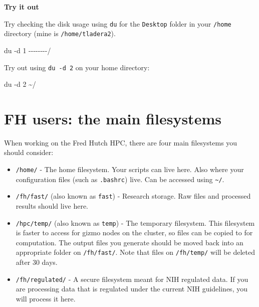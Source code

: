 \documentclass[
  letterpaper,
  DIV=11,
  numbers=noendperiod]{scrreprt}
\newenvironment{Shaded}{\begin{snugshade}}{\end{snugshade}}
\newcommand{\AttributeTok}[1]{\textcolor[rgb]{0.40,0.45,0.13}{#1}}
\newcommand{\FunctionTok}[1]{\textcolor[rgb]{0.28,0.35,0.67}{#1}}
\newcommand{\NormalTok}[1]{\textcolor[rgb]{0.00,0.23,0.31}{#1}}
\providecommand{\tightlist}{%
  \setlength{\itemsep}{0pt}\setlength{\parskip}{0pt}}
\begin{document}
\begin{tcolorbox}[enhanced jigsaw, breakable, leftrule=.75mm, colframe=quarto-callout-color-frame, left=2mm, toprule=.15mm, arc=.35mm, rightrule=.15mm, opacityback=0, bottomrule=.15mm, colback=white]

\vspace{-3mm}\textbf{Try it out}\vspace{3mm}

Try checking the disk usage using \texttt{du} for the \texttt{Desktop}
folder in your \texttt{/home} directory (mine is
\texttt{/home/tladera2}).

\begin{Shaded}
\begin{Highlighting}[]
\FunctionTok{du} \AttributeTok{{-}d}\NormalTok{ 1 }\AttributeTok{{-}{-}{-}{-}{-}{-}{-}{-}}\NormalTok{/}
\end{Highlighting}
\end{Shaded}

Try out using \texttt{du\ -d\ 2} on your home directory:

\begin{Shaded}
\begin{Highlighting}[]
\FunctionTok{du} \AttributeTok{{-}d}\NormalTok{ 2 \textasciitilde{}/}
\end{Highlighting}
\end{Shaded}

\end{tcolorbox}

\section{FH users: the main filesystems}\label{sec-filesystems}

When working on the Fred Hutch HPC, there are four main filesystems you
should consider:

\begin{itemize}
\tightlist
\item
  \texttt{/home/} - The home filesystem. Your scripts can live here.
  Also where your configuration files (such as \texttt{.bashrc}) live.
  Can be accessed using \texttt{\textasciitilde{}/}.
\item
  \texttt{/fh/fast/} (also known as \texttt{fast}) - Research storage.
  Raw files and processed results should live here.
\item
  \texttt{/hpc/temp/} (also known as \texttt{temp}) - The temporary
  filesystem. This filesystem is faster to access for gizmo nodes on the
  cluster, so files can be copied to for computation. The output files
  you generate should be moved back into an appropriate folder on
  \texttt{/fh/fast/}. Note that files on \texttt{/fh/temp/} will be
  deleted after 30 days.
\item
  \texttt{/fh/regulated/} - A secure filesystem meant for NIH regulated
  data. If you are processing data that is regulated under the current
  NIH guidelines, you will process it here.
\end{itemize}
\end{document}
